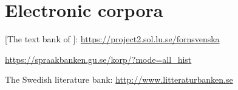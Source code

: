\documentclass[output=paper]{langscibook}
\begin{document}
\section*{Electronic corpora}
\begin{description}[font=\normalfont]
\item[FTB:]  [The text bank of ]:  \url{https://project2.sol.lu.se/fornsvenska} 
\item[\isi{Korp}:] \url{https://spraakbanken.gu.se/korp/?mode=all_hist}
\item[LB:] The Swedish literature bank: \url{http://www.litteraturbanken.se}
\end{description}

{\sloppy\printbibliography[heading=subbibliography,notkeyword=this]}
\end{document}
